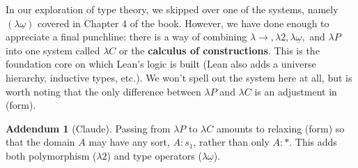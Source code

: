 \documentclass{article}
\theoremstyle{definition}
\newtheorem{addendum}{Addendum}
\newcommand{\1}{\mathbb{1}}
\newcommand{\0}{\mathbb{0}}
\begin{document}
In our exploration of type theory, we skipped over one of the systems, namely $(\lambda \underline{\omega})$ covered in Chapter 4 of the book. However, we have done enough to appreciate a final punchline: there is a way of combining $\lambda\to, \lambda 2, \lambda\underline{\omega},$ and $\lambda P$ into one system called $\lambda C$ or the \textbf{calculus of constructions}. This is the foundation core on which Lean's logic is built (Lean also adds a universe hierarchy, inductive types, etc.). We won't spell out the system here at all, but is worth noting that the only difference between $\lambda P$ and $\lambda C$ is an adjustment in (form).

\begin{addendum}[Claude]
    Passing from $\lambda P$ to $\lambda C$ amounts to relaxing (form) so that the domain $A$ may have any sort, $A : s_1$, rather than only $A : *$. This adds both polymorphism ($\lambda 2$) and type operators ($\lambda\underline{\omega}$).
\end{addendum}
\end{document}
